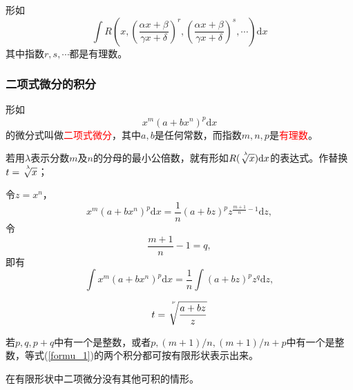 \documentclass[12pt,a4paper]{article}
\newcommand{\dif}{\mathrm{d}}
\begin{document}
形如
\begin{equation}
\int R\left(x, \left(\frac{\alpha x+\beta}{\gamma x+\delta} \right)^r, \left(\frac{\alpha x+\beta}{\gamma x+\delta} \right)^s, \cdots \right) \dif x
\end{equation}
其中指数$r, s, \cdots$都是有理数。


\subsubsection{二项式微分的积分}
形如
\begin{equation}
x^m (a+bx^n)^p \dif x
\end{equation}
的微分式叫做\textcolor{red}{二项式微分}，其中$a, b$是任何常数，而指数$m, n, p$是\textcolor{red}{有理数}。

若用$\lambda$表示分数$m$及$n$的分母的最小公倍数，就有形如$R(\sqrt[\uproot{6}\leftroot{-2}\lambda]{x})\dif x$的表达式。作替换$t = \sqrt[\uproot{6}\leftroot{-2}\lambda]{x}$；

令$z = x^n$，
\begin{equation}
x^m (a+bx^n)^p \dif x = \frac{1}{n} (a+bz)^p z^{\frac{m+1}{n} -1} \dif z ,
\end{equation}
令
\begin{equation}
\frac{m+1}{n} -1 = q ,
\end{equation}
即有
\begin{equation}
\int x^m (a+bx^n)^p \dif x = \frac{1}{n} \int (a+bz)^p z^{q} \dif z ,
\label{formu_1}
\end{equation}


\begin{equation}
t = \sqrt[\uproot{16}\leftroot{-2}\nu]{\frac{a+bz}{z}}
\end{equation}

若$p, q, p+q$中有一个是整数，或者$p, (m+1)/n, (m+1)/n +p$中有一个是整数，等式(\ref{formu_1})的两个积分都可按有限形状表示出来。

在有限形状中二项微分没有其他可积的情形。
\end{document}
